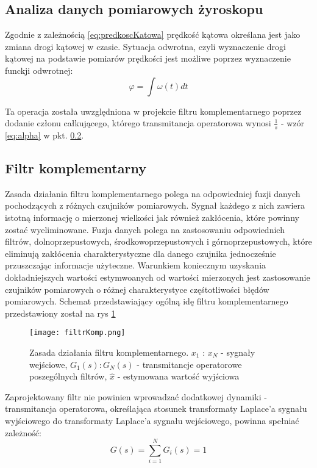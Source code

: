 \subsection{Analiza danych pomiarowych żyroskopu}
\label{gyro}
Zgodnie z zależnością \ref{eq:predkoscKatowa} prędkość kątowa określana jest jako zmiana drogi kątowej w czasie. Sytuacja odwrotna, czyli wyznaczenie drogi kątowej na podstawie pomiarów prędkości jest możliwe poprzez wyznaczenie funckji odwrotnej:
\begin{equation}  
    \varphi = \int\omega(t)dt
\end{equation}

Ta operacja została uwzględniona w projekcie filtru komplementarnego poprzez dodanie członu całkującego, którego transmitancja operatorowa wynosi $\frac{1}{s}$ - wzór \ref{eq:alpha} w pkt. \ref{kompZasadaDzialania}.

\subsection{Filtr komplementarny}
\label{kompZasadaDzialania}
Zasada działania filtru komplementarnego polega na odpowiedniej fuzji danych pochodzących z różnych czujników pomiarowych. Sygnał każdego z nich zawiera istotną informację o mierzonej wielkości jak również zakłócenia, które powinny zostać wyeliminowane. Fuzja danych polega na zastosowaniu odpowiednich filtrów, dolnoprzepustowych, środkowoprzepustowych i górnoprzepustowych, które eliminują zakłócenia charakterystyczne dla danego czujnika jednocześnie przuszczając informacje użyteczne. Warunkiem koniecznym uzyskania dokładniejszych wartości estymwoanych od wartości mierzonych jest zastosowanie czujników pomiarowych o różnej charakterystyce częśtotliwości błędów pomiarowych. Schemat przedstawiający ogólną idę filtru komplementarnego przedstawiony został na rys \ref{fig:kompGeneral}
\begin{figure}[h]
    \centering
    \texttt{[image: filtrKomp.png]}
    \caption{Zasada działania filtru komplementarnego. $x_1$ : $x_N$ - sygnały wejściowe, $G_1(s) : G_N(s)$ - transmitancje operatorowe poszególnych filtrów, $\hat{x}$ - estymowana wartość wyjściowa }
    \label{fig:kompGeneral}
\end{figure}

Zaprojektowany filtr nie powinien wprowadzać dodatkowej dynamiki - transmitancja operatorowa, określająca stosunek transformaty Laplace'a sygnału wyjściowego do transformaty Laplace'a sygnału wejściowego, powinna spełniać zależność:
\begin{equation}
    G(s)=\sum_{i=1}^{N}G_{i}(s)=1
    \label{eq:zasadaKomplementarnosci}
\end{equation}

